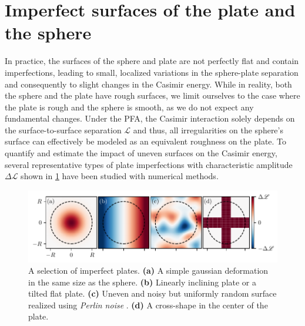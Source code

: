 \section{Imperfect surfaces of the plate and the sphere}
\label{sec:3:imperfect-plates}

In practice, the surfaces of the sphere and plate are not perfectly flat and contain imperfections, leading to small, localized variations in the sphere-plate separation and consequently to slight changes in the Casimir energy. 
While in reality, both the sphere and the plate have rough surfaces, we limit ourselves to the case where the plate is rough and the sphere is smooth, as we do not expect any fundamental changes.
Under the PFA, the Casimir interaction solely depends on the surface-to-surface separation $\mathscr{L}$ and thus, all irregularities on the sphere's surface can effectively be modeled as an equivalent roughness on the plate.
To quantify and estimate the impact of uneven surfaces on the Casimir energy, several representative types of plate imperfections with characteristic amplitude $\Delta \mathscr{L}$ shown in \cref{fig:3:imperfect-plates} have been studied with numerical methods.
\begin{figure}[!htbp]
  \centering
  \includegraphics[width=\textwidth]{../figures/casimir/imperfect-plates-advanced-colorbar.pdf}
  \caption{A selection of imperfect plates. \textbf{(a)} A simple gaussian deformation in the same size as the sphere. \textbf{(b)} Linearly inclining plate or a tilted flat plate. \textbf{(c)} Uneven and noisy but uniformly random surface realized using \textit{Perlin noise} \cite{Perlin_1985}. \textbf{(d)} A cross-shape in the center of the plate.}
  \label{fig:3:imperfect-plates}
\end{figure}
